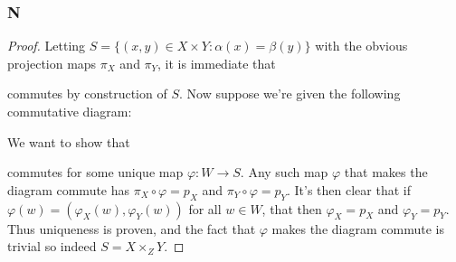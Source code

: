 \documentclass{article}
\begin{document}
\subsubsection{N}\label{1.3.N}
\begin{proof}
    Letting $S=\{(x,y)\in X\times Y: \alpha(x)=\beta(y)\}$ with the obvious projection maps $\pi_X$ and $\pi_Y$, it is immediate that
    \begin{center}
    \end{center}
    commutes by construction of $S$. Now suppose we're given the following commutative diagram:
    \begin{center}
    \end{center}
    We want to show that
    \begin{center}
    \end{center}
    commutes for some unique map $\varphi:W\to S$. Any such map $\varphi$ that makes the diagram commute has $\pi_X\circ \varphi=p_X$ and $\pi_Y\circ \varphi=p_Y$. It's then clear that if $\varphi(w)=(\varphi_X(w), \varphi_Y(w))$ for all $w\in W$, that then $\varphi_X=p_X$ and $\varphi_Y=p_Y$. Thus uniqueness is proven, and the fact that $\varphi$ makes the diagram commute is trivial so indeed $S=X\times_Z Y$.
\end{proof}
\end{document}
